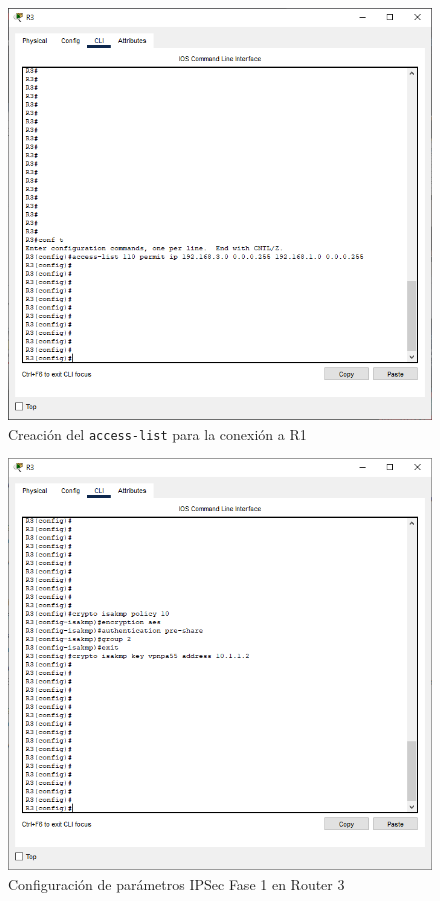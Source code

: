 \documentclass{article}
\begin{document}
        \begin{figure}[!h]
            \centering
            \includegraphics[scale=0.45]{img/task2-step1.png}
            \caption{Creación del \texttt{access-list} para la conexión a R1}
            \label{fig:task2-step1}
        \end{figure}

        \clearpage
        \begin{figure}[!h]
            \centering
            \includegraphics[scale=0.45]{img/task2-step2.png}
            \caption{Configuración de parámetros IPSec Fase 1 en Router 3}
            \label{fig:task2-step2}
        \end{figure}
        
\end{document}
